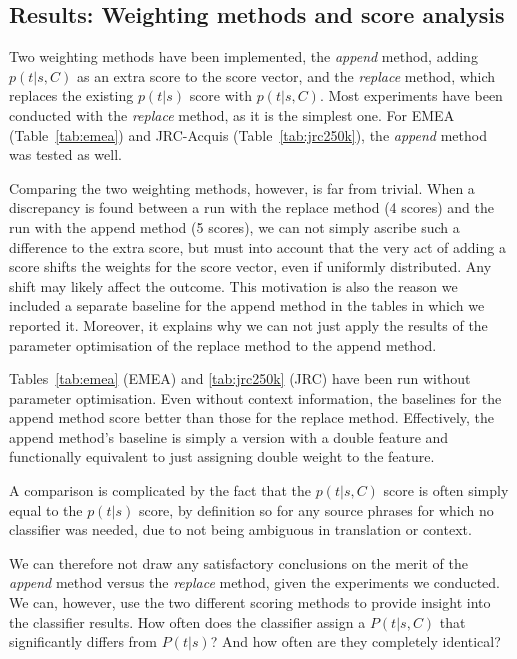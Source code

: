 \documentclass[smallextended]{svjour3}       %
\theoremstyle{break}
\begin{document}
\subsection{Results: Weighting methods and score analysis}
\label{sec:weighting}

Two weighting methods have been implemented, the \emph{append} method, adding
$p(t|s,C)$ as an extra score to the score vector, and the \emph{replace}
method, which replaces the existing $p(t|s)$ score with $p(t|s,C)$. Most
experiments have been conducted with the \emph{replace} method, as it is the
simplest one. For EMEA (Table~\ref{tab:emea}) and JRC-Acquis
(Table~\ref{tab:jrc250k}), the \emph{append} method was tested as well.

Comparing the two weighting methods, however, is far from trivial. When a
discrepancy is found between a run with the replace method (4 scores) and the
run with the append method (5 scores), we can not simply ascribe such a
difference to the extra score, but must into account that the very act of
adding a score shifts the weights for the score vector, even if uniformly
distributed. Any shift may likely affect the outcome. This
motivation is also the reason we included a separate baseline for the append
method in the tables in which we reported it. Moreover, it explains why we can
not just apply the results of the parameter optimisation of the replace method
to the append method.

Tables~\ref{tab:emea} (EMEA) and \ref{tab:jrc250k} (JRC) have been run without
parameter optimisation. Even without context information, the baselines for the
append method score better than those for the replace method. Effectively, the
append method's baseline is simply a version with a double feature and
functionally equivalent to just assigning double weight to the feature.

A comparison is complicated by the fact that the $p(t|s,C)$ score is often simply
equal to the $p(t|s)$ score, by definition so for any source phrases for which no
classifier was needed, due to not being ambiguous in translation or context. 

We can therefore not draw any satisfactory conclusions on the merit of the
\emph{append} method versus the \emph{replace} method, given the experiments we
conducted. We can, however, use the two different scoring methods to provide
insight into the classifier results. How often does the classifier assign a
$P(t|s,C)$ that significantly differs from $P(t|s)$? And how often are they
completely identical?
\end{document}
